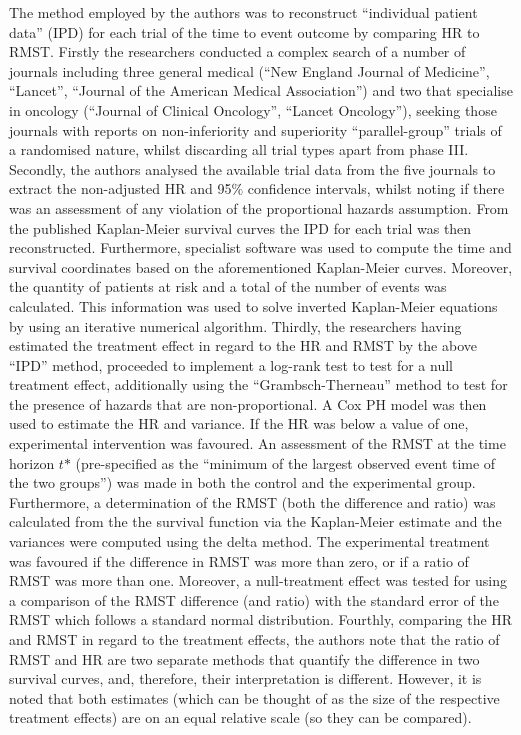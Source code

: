 \documentclass[12pt,twoside]{reedthesis}
\begin{document}
The method employed by the authors was to reconstruct ``individual patient data'' (IPD) for each trial of the time to event outcome by comparing HR to RMST. Firstly the researchers conducted a complex search of a number of journals including three general medical (``New England Journal of Medicine'', ``Lancet'', ``Journal of the American Medical Association'') and two that specialise in oncology (``Journal of Clinical Oncology'', ``Lancet Oncology''), seeking those journals with reports on non-inferiority and superiority ``parallel-group'' trials of a randomised nature, whilst discarding all trial types apart from phase III. Secondly, the authors analysed the available trial data from the five journals to extract the non-adjusted HR and 95\(\%\) confidence intervals, whilst noting if there was an assessment of any violation of the proportional hazards assumption. From the published Kaplan-Meier survival curves the IPD for each trial was then reconstructed. Furthermore, specialist software was used to compute the time and survival coordinates based on the aforementioned Kaplan-Meier curves. Moreover, the quantity of patients at risk and a total of the number of events was calculated. This information was used to solve inverted Kaplan-Meier equations by using an iterative numerical algorithm. Thirdly, the researchers having estimated the treatment effect in regard to the HR and RMST by the above ``IPD'' method, proceeded to implement a log-rank test to test for a null treatment effect, additionally using the ``Grambsch-Therneau'' method to test for the presence of hazards that are non-proportional. A Cox PH model was then used to estimate the HR and variance. If the HR was below a value of one, experimental intervention was favoured. An assessment of the RMST at the time horizon \(\textit{t*}\) (pre-specified as the ``minimum of the largest observed event time of the two groups'') was made in both the control and the experimental group. Furthermore, a determination of the RMST (both the difference and ratio) was calculated from the the survival function via the Kaplan-Meier estimate and the variances were computed using the delta method.
The experimental treatment was favoured if the difference in RMST was more than zero, or if a ratio of RMST was more than one. Moreover, a null-treatment effect was tested for using a comparison of the RMST difference (and ratio) with the standard error of the RMST which follows a standard normal distribution. Fourthly, comparing the HR and RMST in regard to the treatment effects, the authors note that the ratio of RMST and HR are two separate methods that quantify the difference in two survival curves, and, therefore, their interpretation is different. However, it is noted that both estimates (which can be thought of as the size of the respective treatment effects) are on an equal relative scale (so they can be compared).
\end{document}
